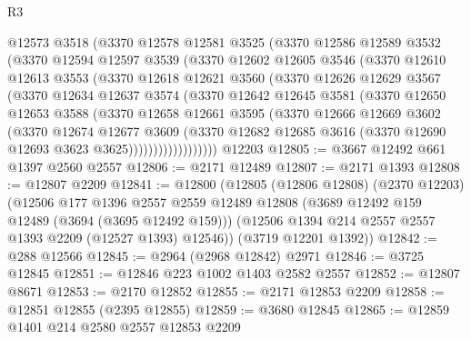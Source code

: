 \begin{lexlean}{R3}
\begin{coremodule}
          @12573
          @3518
          (@3370
            @12578
            @12581
            @3525
            (@3370
              @12586
              @12589
              @3532
              (@3370
                @12594
                @12597
                @3539
                (@3370
                  @12602
                  @12605
                  @3546
                  (@3370
                    @12610
                    @12613
                    @3553
                    (@3370
                      @12618
                      @12621
                      @3560
                      (@3370
                        @12626
                        @12629
                        @3567
                        (@3370
                          @12634
                          @12637
                          @3574
                          (@3370
                            @12642
                            @12645
                            @3581
                            (@3370
                              @12650
                              @12653
                              @3588
                              (@3370
                                @12658
                                @12661
                                @3595
                                (@3370
                                  @12666
                                  @12669
                                  @3602
                                  (@3370
                                    @12674
                                    @12677
                                    @3609
                                    (@3370
                                      @12682
                                      @12685
                                      @3616
                                      (@3370 @12690 @12693 @3623 @3625))))))))))))))))))
    @12203
@12805 := @3667 @12492 @661 @1397 @2560 @2557
@12806 := @2171 @12489
@12807 := @2171 @1393
@12808 := @12807 @2209
@12841 := @12800
    (@12805
      (@12806 @12808)
      (@2370 @12203)
      (@12506
        @177
        @1396
        @2557
        @2559
        @12489
        @12808
        (@3689 @12492 @159 @12489 (@3694 (@3695 @12492 @159)))
        (@12506 @1394 @214 @2557 @2557 @1393 @2209 (@12527 @1393) @12546))
      (@3719 @12201 @1392))
@12842 := @288 @12566
@12845 := @2964 (@2968 @12842) @2971
@12846 := @3725 @12845
@12851 := @12846 @223 @1002 @1403 @2582 @2557
@12852 := @12807 @8671
@12853 := @2170 @12852
@12855 := @2171 @12853 @2209
@12858 := @12851 @12855 (@2395 @12855)
@12859 := @3680 @12845
@12865 := @12859 @1401 @214 @2580 @2557 @12853 @2209

\end{coremodule}
\end{lexlean}
